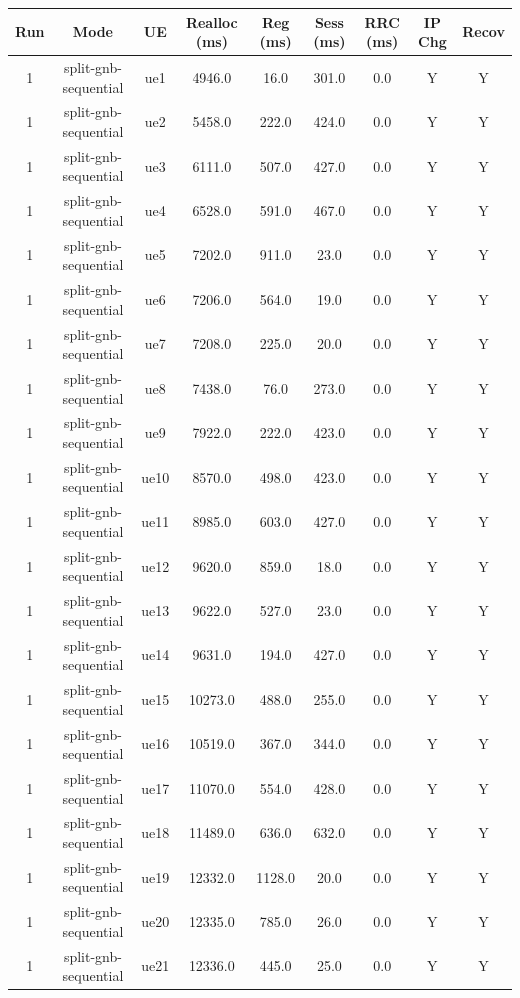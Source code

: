 \begin{table}[ht]
\centering
\begin{tabular}{|c|c|c|c|c|c|c|c|c|}
\hline
Run & Mode & UE & Realloc (ms) & Reg (ms) & Sess (ms) & RRC (ms) & IP Chg & Recov \\
\hline
1 & split-gnb-sequential & ue1 & 4946.0 & 16.0 & 301.0 & 0.0 & Y & Y \\
1 & split-gnb-sequential & ue2 & 5458.0 & 222.0 & 424.0 & 0.0 & Y & Y \\
1 & split-gnb-sequential & ue3 & 6111.0 & 507.0 & 427.0 & 0.0 & Y & Y \\
1 & split-gnb-sequential & ue4 & 6528.0 & 591.0 & 467.0 & 0.0 & Y & Y \\
1 & split-gnb-sequential & ue5 & 7202.0 & 911.0 & 23.0 & 0.0 & Y & Y \\
1 & split-gnb-sequential & ue6 & 7206.0 & 564.0 & 19.0 & 0.0 & Y & Y \\
1 & split-gnb-sequential & ue7 & 7208.0 & 225.0 & 20.0 & 0.0 & Y & Y \\
1 & split-gnb-sequential & ue8 & 7438.0 & 76.0 & 273.0 & 0.0 & Y & Y \\
1 & split-gnb-sequential & ue9 & 7922.0 & 222.0 & 423.0 & 0.0 & Y & Y \\
1 & split-gnb-sequential & ue10 & 8570.0 & 498.0 & 423.0 & 0.0 & Y & Y \\
1 & split-gnb-sequential & ue11 & 8985.0 & 603.0 & 427.0 & 0.0 & Y & Y \\
1 & split-gnb-sequential & ue12 & 9620.0 & 859.0 & 18.0 & 0.0 & Y & Y \\
1 & split-gnb-sequential & ue13 & 9622.0 & 527.0 & 23.0 & 0.0 & Y & Y \\
1 & split-gnb-sequential & ue14 & 9631.0 & 194.0 & 427.0 & 0.0 & Y & Y \\
1 & split-gnb-sequential & ue15 & 10273.0 & 488.0 & 255.0 & 0.0 & Y & Y \\
1 & split-gnb-sequential & ue16 & 10519.0 & 367.0 & 344.0 & 0.0 & Y & Y \\
1 & split-gnb-sequential & ue17 & 11070.0 & 554.0 & 428.0 & 0.0 & Y & Y \\
1 & split-gnb-sequential & ue18 & 11489.0 & 636.0 & 632.0 & 0.0 & Y & Y \\
1 & split-gnb-sequential & ue19 & 12332.0 & 1128.0 & 20.0 & 0.0 & Y & Y \\
1 & split-gnb-sequential & ue20 & 12335.0 & 785.0 & 26.0 & 0.0 & Y & Y \\
1 & split-gnb-sequential & ue21 & 12336.0 & 445.0 & 25.0 & 0.0 & Y & Y \\

\end{tabular}
\end{table}
